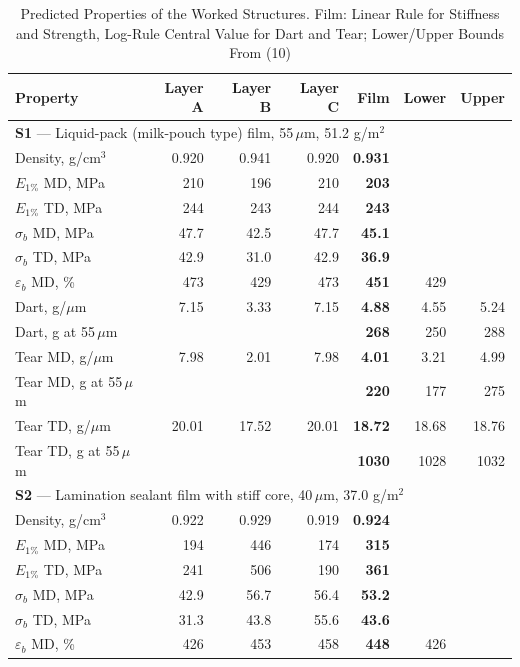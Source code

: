 \documentclass[conference,a4paper]{IEEEtran}
\begin{document}
\begin{table}[!t]
\caption{Predicted Properties of the Worked Structures. Film: Linear Rule for Stiffness and Strength, Log-Rule Central Value for Dart and Tear; Lower/Upper Bounds From (10)}
\label{tab:pred}\centering\footnotesize
\begin{tabular}{lrrrrrr}
\toprule
Property & Layer A & Layer B & Layer C & Film & Lower & Upper \\
\midrule
\multicolumn{7}{l}{\textbf{S1} --- Liquid-pack (milk-pouch type) film, 55\,$\mu$m, 51.2 g/m$^2$} \\
\midrule
Density, g/cm$^3$ & 0.920 & 0.941 & 0.920 & \textbf{0.931} & & \\
$E_{1\%}$ MD, MPa & 210 & 196 & 210 & \textbf{203} &  & \\
$E_{1\%}$ TD, MPa & 244 & 243 & 244 & \textbf{243} &  & \\
$\sigma_b$ MD, MPa & 47.7 & 42.5 & 47.7 & \textbf{45.1} &  & \\
$\sigma_b$ TD, MPa & 42.9 & 31.0 & 42.9 & \textbf{36.9} &  & \\
$\varepsilon_b$ MD, \% & 473 & 429 & 473 & \textbf{451} & 429 & \\
Dart, g/$\mu$m & 7.15 & 3.33 & 7.15 & \textbf{4.88} & 4.55 & 5.24 \\
\quad Dart, g at 55\,$\mu$m & & & & \textbf{268} & 250 & 288 \\
Tear MD, g/$\mu$m & 7.98 & 2.01 & 7.98 & \textbf{4.01} & 3.21 & 4.99 \\
\quad Tear MD, g at 55\,$\mu$m & & & & \textbf{220} & 177 & 275 \\
Tear TD, g/$\mu$m & 20.01 & 17.52 & 20.01 & \textbf{18.72} & 18.68 & 18.76 \\
\quad Tear TD, g at 55\,$\mu$m & & & & \textbf{1030} & 1028 & 1032 \\
\midrule
\multicolumn{7}{l}{\textbf{S2} --- Lamination sealant film with stiff core, 40\,$\mu$m, 37.0 g/m$^2$} \\
\midrule
Density, g/cm$^3$ & 0.922 & 0.929 & 0.919 & \textbf{0.924} & & \\
$E_{1\%}$ MD, MPa & 194 & 446 & 174 & \textbf{315} &  & \\
$E_{1\%}$ TD, MPa & 241 & 506 & 190 & \textbf{361} &  & \\
$\sigma_b$ MD, MPa & 42.9 & 56.7 & 56.4 & \textbf{53.2} &  & \\
$\sigma_b$ TD, MPa & 31.3 & 43.8 & 55.6 & \textbf{43.6} &  & \\
$\varepsilon_b$ MD, \% & 426 & 453 & 458 & \textbf{448} & 426 & \\

\end{tabular}
\end{table}
\end{document}
